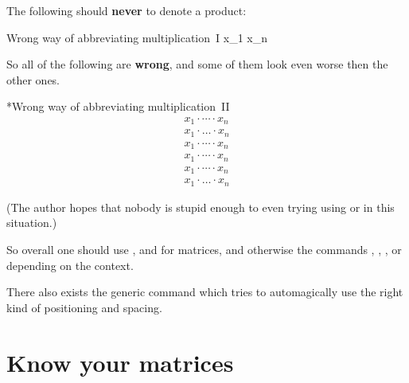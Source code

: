 The following should \textbf{never} to denote a product:
\begin{showcode}{Wrong way of abbreviating multiplication~I}
x_1  \cdot x_n
\end{showcode}
So all of the following are \textbf{wrong}, and some of them look even worse then the other ones.
\begin{showlatex}*{Wrong way of abbreviating multiplication~II}
\begin{gather*}
  x_1 \cdot \dotsb \cdot x_n \\
  x_1 \cdot \dotsc \cdot x_n \\
  x_1 \cdot \dotsm \cdot x_n \\
  x_1 \cdot \dotsi \cdot x_n \\
  x_1 \cdot \cdots \cdot x_n \\
  x_1 \cdot \ldots \cdot x_n
\end{gather*}
\end{showlatex}
(The author hopes that nobody is stupid enough to even trying using  or  in this situation.)

So overall one should use ,  and  for matrices, and otherwise the commands , , ,  or  depending on the context.

There also exists the generic command  which tries to automagically use the right kind of positioning and spacing.





\section{Know your matrices}


